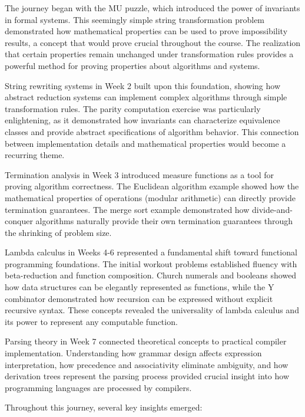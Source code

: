 \documentclass{article}
\theoremstyle{plain}
\theoremstyle{definition}
\theoremstyle{remark}
\begin{document}
The journey began with the MU puzzle, which introduced the power of invariants in formal systems. This seemingly simple string transformation problem demonstrated how mathematical properties can be used to prove impossibility results, a concept that would prove crucial throughout the course. The realization that certain properties remain unchanged under transformation rules provides a powerful method for proving properties about algorithms and systems.

String rewriting systems in Week 2 built upon this foundation, showing how abstract reduction systems can implement complex algorithms through simple transformation rules. The parity computation exercise was particularly enlightening, as it demonstrated how invariants can characterize equivalence classes and provide abstract specifications of algorithm behavior. This connection between implementation details and mathematical properties would become a recurring theme.

Termination analysis in Week 3 introduced measure functions as a tool for proving algorithm correctness. The Euclidean algorithm example showed how the mathematical properties of operations (modular arithmetic) can directly provide termination guarantees. The merge sort example demonstrated how divide-and-conquer algorithms naturally provide their own termination guarantees through the shrinking of problem size.

Lambda calculus in Weeks 4-6 represented a fundamental shift toward functional programming foundations. The initial workout problems established fluency with beta-reduction and function composition. Church numerals and booleans showed how data structures can be elegantly represented as functions, while the Y combinator demonstrated how recursion can be expressed without explicit recursive syntax. These concepts revealed the universality of lambda calculus and its power to represent any computable function.

Parsing theory in Week 7 connected theoretical concepts to practical compiler implementation. Understanding how grammar design affects expression interpretation, how precedence and associativity eliminate ambiguity, and how derivation trees represent the parsing process provided crucial insight into how programming languages are processed by compilers.

Throughout this journey, several key insights emerged:
\end{document}
